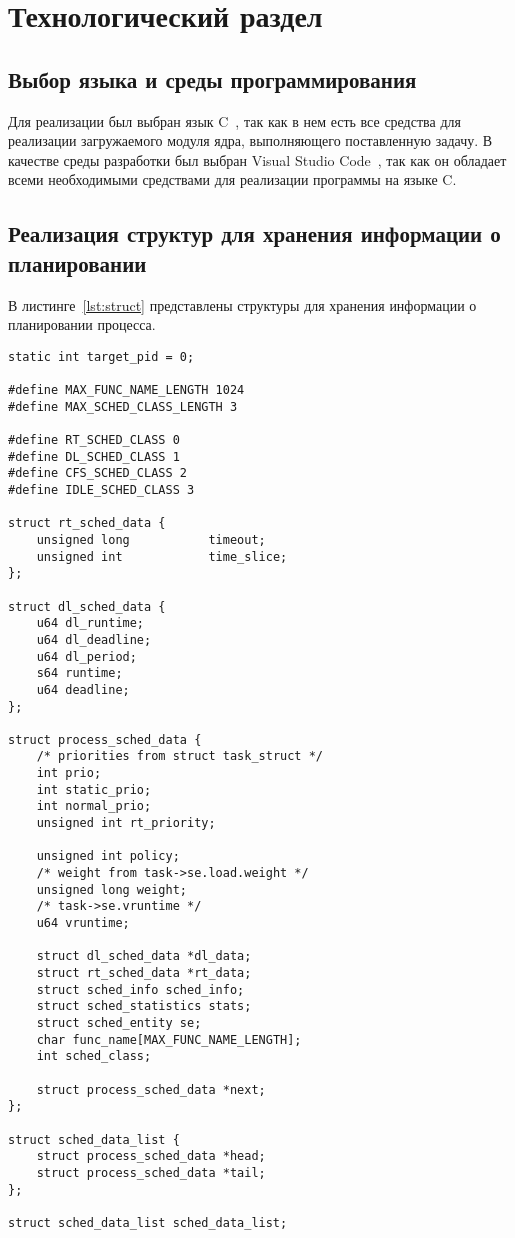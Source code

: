 \section{Технологический раздел}

\subsection{Выбор языка и среды программирования}

Для реализации был выбран язык C~\cite{c99}, так как в нем есть все средства для реализации загружаемого модуля ядра, выполняющего поставленную задачу.
В качестве среды разработки был выбран Visual Studio Code~\cite{vscode}, так как он обладает всеми необходимыми средствами для реализации программы на языке C.

\subsection{Реализация структур для хранения информации о планировании}


В листинге~\ref{lst:struct} представлены структуры для хранения информации о планировании процесса.

\begin{lstlisting}[label=lst:struct,caption=Структуры для хранения информации о планировании процесса]
static int target_pid = 0;

#define MAX_FUNC_NAME_LENGTH 1024
#define MAX_SCHED_CLASS_LENGTH 3

#define RT_SCHED_CLASS 0
#define DL_SCHED_CLASS 1
#define CFS_SCHED_CLASS 2
#define IDLE_SCHED_CLASS 3

struct rt_sched_data {
	unsigned long			timeout;
	unsigned int			time_slice;
};

struct dl_sched_data {
	u64	dl_runtime;	
	u64	dl_deadline;
	u64	dl_period;
	s64	runtime;
	u64	deadline;	
};

struct process_sched_data {
	/* priorities from struct task_struct */
	int prio; 
	int static_prio;
	int normal_prio;
	unsigned int rt_priority;
	
	unsigned int policy; 
	/* weight from task->se.load.weight */
	unsigned long weight;
	/* task->se.vruntime */
	u64 vruntime; 
	
	struct dl_sched_data *dl_data;
	struct rt_sched_data *rt_data;
	struct sched_info sched_info;
	struct sched_statistics stats;
	struct sched_entity se;
	char func_name[MAX_FUNC_NAME_LENGTH];
	int sched_class;
	
	struct process_sched_data *next;
};

struct sched_data_list {
	struct process_sched_data *head;
	struct process_sched_data *tail;
};

struct sched_data_list sched_data_list;

\end{lstlisting}

